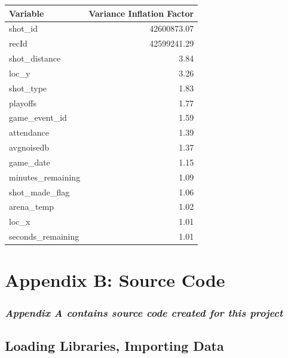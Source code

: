 \documentclass[american,]{article}
\begin{document}
\begin{table}[H]
\centering
\begin{tabular}{lr}
\toprule
Variable & Variance Inflation Factor\\
\midrule
\rowcolor{gray!6}  shot\_id & 42600873.07\\
recId & 42599241.29\\
\rowcolor{gray!6}  shot\_distance & 3.84\\
loc\_y & 3.26\\
\rowcolor{gray!6}  shot\_type & 1.83\\
\addlinespace
playoffs & 1.77\\
\rowcolor{gray!6}  game\_event\_id & 1.59\\
attendance & 1.39\\
\rowcolor{gray!6}  avgnoisedb & 1.37\\
game\_date & 1.15\\
\addlinespace
\rowcolor{gray!6}  minutes\_remaining & 1.09\\
shot\_made\_flag & 1.06\\
\rowcolor{gray!6}  arena\_temp & 1.02\\
loc\_x & 1.01\\
\rowcolor{gray!6}  seconds\_remaining & 1.01\\
\bottomrule
\end{tabular}
\end{table}

\newpage

\hypertarget{appendix-b-source-code}{%
\section{Appendix B: Source Code}\label{appendix-b-source-code}}

\hypertarget{appendix-a-contains-source-code-created-for-this-project}{%
\subsubsection{\texorpdfstring{\emph{Appendix A contains source code created for this project}}{Appendix A contains source code created for this project}}\label{appendix-a-contains-source-code-created-for-this-project}}

\hypertarget{loading-libraries-importing-data}{%
\subsection{Loading Libraries, Importing Data}\label{loading-libraries-importing-data}}
\end{document}
